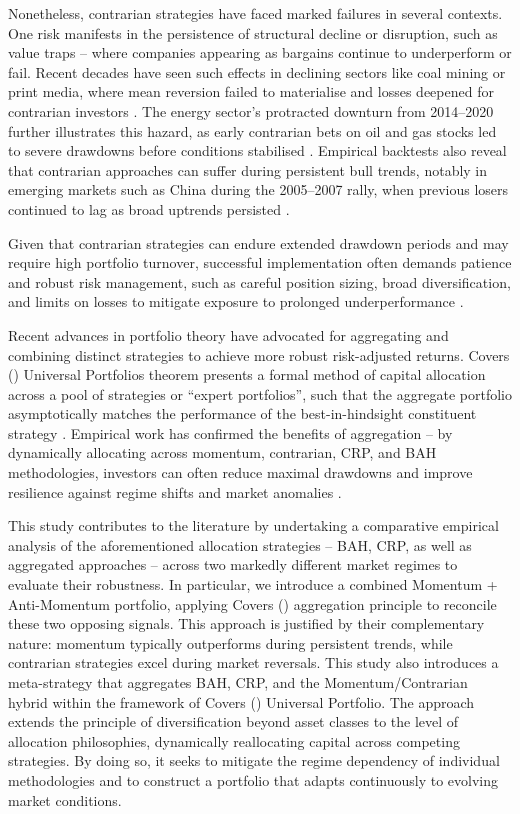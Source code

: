 \documentclass[12pt,a4paper]{report}
\begin{document}
Nonetheless, contrarian strategies have faced marked failures in several contexts. One risk manifests in the persistence of structural decline or disruption, such as value traps -- where companies appearing as bargains continue to underperform or fail. Recent decades have seen such effects in declining sectors like coal mining or print media, where mean reversion failed to materialise and losses deepened for contrarian investors \citep{Lakonishok1994}. The energy sector’s protracted downturn from 2014–2020 further illustrates this hazard, as early contrarian bets on oil and gas stocks led to severe drawdowns before conditions stabilised \citep{Asness2015}. Empirical backtests also reveal that contrarian approaches can suffer during persistent bull trends, notably in emerging markets such as China during the 2005–2007 rally, when previous losers continued to lag as broad uptrends persisted \citep{Chui2010}.

Given that contrarian strategies can endure extended drawdown periods and may require high portfolio turnover, successful implementation often demands patience and robust risk management, such as careful position sizing, broad diversification, and limits on losses to mitigate exposure to prolonged underperformance \citep{DeBondt1987}.

Recent advances in portfolio theory have advocated for aggregating and combining distinct strategies to achieve more robust risk-adjusted returns. Cover\textquotesingle s (\citeyear{Cover1991}) Universal Portfolios theorem presents a formal method of capital allocation across a pool of strategies or ``expert portfolios'', such that the aggregate portfolio asymptotically matches the performance of the best-in-hindsight constituent strategy \citep{Ordentlich1998}. Empirical work has confirmed the benefits of aggregation -- by dynamically allocating across momentum, contrarian, CRP, and BAH methodologies, investors can often reduce  maximal drawdowns and improve resilience against regime shifts and market anomalies \citep{Lu2025TrendFolios}.

This study contributes to the literature by undertaking a comparative empirical analysis of the aforementioned allocation strategies -- BAH, CRP, as well as aggregated approaches -- across two markedly different market regimes to evaluate their robustness. In particular, we introduce a combined Momentum + Anti-Momentum portfolio, applying Cover\textquotesingle s (\citeyear{Cover1991}) aggregation principle to reconcile these two opposing signals. This approach is justified by their complementary nature: momentum typically outperforms during persistent trends, while contrarian strategies excel during market reversals. This study also introduces a meta-strategy that aggregates BAH, CRP, and the Momentum/Contrarian hybrid within the framework of Cover\textquotesingle s (\citeyear{Cover1991}) Universal Portfolio. The approach extends the principle of diversification beyond asset classes to the level of allocation philosophies, dynamically reallocating capital across competing strategies. By doing so, it seeks to mitigate the regime dependency of individual methodologies and to construct a portfolio that adapts continuously to evolving market conditions.
\end{document}
